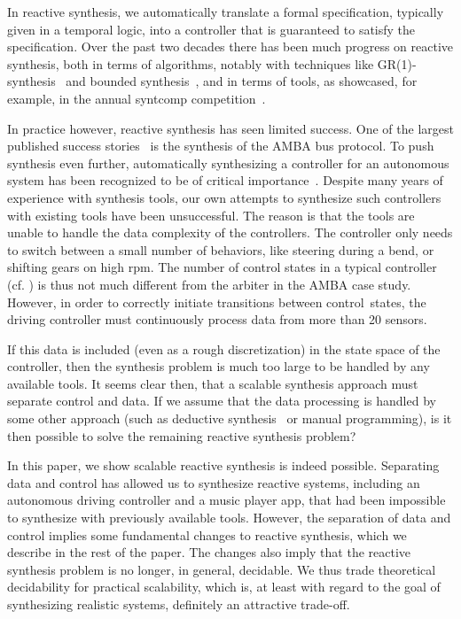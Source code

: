 In reactive synthesis, we automatically translate a formal specification, typically
given in a temporal logic, into a controller that is guaranteed to
satisfy the specification. Over the past two decades there has been
much progress on reactive synthesis, both in terms of algorithms,
notably with techniques like GR(1)-synthesis~\cite{bloem2012synthesis} and bounded synthesis~\cite{Schewe:2013},
and in terms of tools, as showcased, for example, in the annual
{\sc syntcomp} competition~\cite{SYNTCOMP2017}.

In practice however, reactive synthesis has seen limited success.
One of the largest published success stories~\cite{Khalimov2014ParameterizedSynthesisCaseStudyAMBA} is the synthesis of
the AMBA bus
protocol. To push synthesis even further, automatically synthesizing a controller for an autonomous system has been recognized to be of critical importance~\cite{wongpiromsarn2013synthesis}.
Despite
many years of experience with synthesis tools, our own attempts to
synthesize such controllers with existing tools have been unsuccessful. The reason is that the tools are unable to
handle the data complexity of the controllers. The controller only
needs to switch between a small number of behaviors, like steering
during a bend, or shifting gears on high rpm. The number of control
states in a typical controller (cf. \cite{SCAV2017}) is thus not much
different from the arbiter in the AMBA case study. However, in order to correctly initiate transitions between \mbox{control states}, the driving
controller must continuously process data from more than 20 sensors.

If this data is included (even as a rough discretization) in the state
space of the controller, then the synthesis problem is much too large
to be handled by any available tools. It seems clear then, that a scalable synthesis approach must separate
control and data. If we assume that the data processing is handled by
some other approach (such as deductive synthesis~\cite{Manna:1980:DAP:357084.357090} or manual programming), is it
then possible to solve the remaining reactive synthesis problem?

In this paper, we show scalable reactive synthesis is indeed possible. Separating
data and control has allowed us to synthesize reactive systems, including an
autonomous driving controller and a music player app, that
had been impossible to synthesize with previously available tools. However, the
separation of data and control implies some fundamental changes to
reactive synthesis, which we describe in the rest of the paper. The
changes also imply that the reactive synthesis problem is no
longer, in general, decidable. We thus trade theoretical
decidability for practical scalability, which is, at least with regard to the goal of synthesizing realistic systems, definitely an attractive trade-off.


